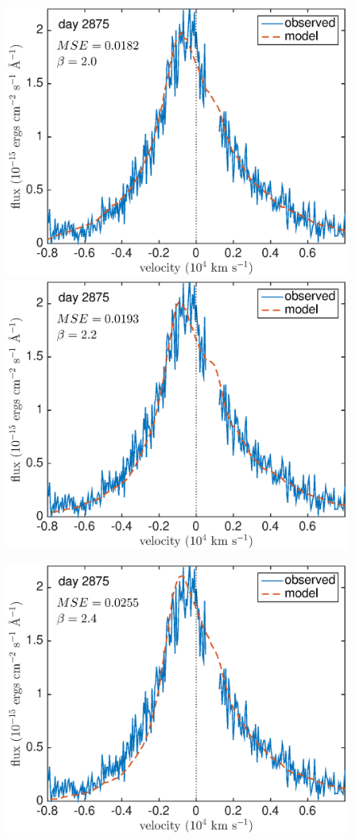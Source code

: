 \begin{figure}
\includegraphics[clip = true, scale=0.43, trim=10 0 45 0]{chapters/chapter5/images/MSE/d2875_B/d2875_B2}
\includegraphics[clip = true, scale=0.43, trim=42 0 45 0]{chapters/chapter5/images/MSE/d2875_B/d2875_B2_2}

\includegraphics[clip = true, scale=0.43, trim=17 0 45 0]{chapters/chapter5/images/MSE/d2875_B/d2875_B2_4}


\end{figure}
